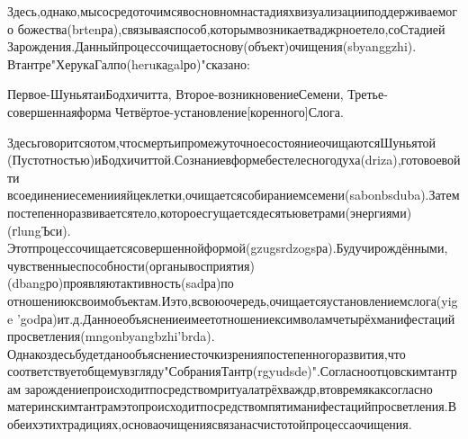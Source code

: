 Здесь,однако,мысосредоточимсявосновномнастадияхвизуализацииподдерживаемого
божества(brtenра),связываяспособ,которымвозникаетваджрноетело,соСтадией
Зарождения.Данныйпроцессочищаетоснову(объект)очищения(sbyanggzhi).
Втантре"ХерукаГалпо(heruкаgalро)"сказано:

Первое-ШуньятаиБодхичитта,
Второе-возникновениеСемени,
Третье-совершеннаяформа
Четвёртое-установление[коренного]Слога.

Здесьговоритсяотом,чтосмертьипромежуточноесостояниеочищаютсяШуньятой
(Пустотностью)иБодхичиттой.Сознаниевформебестелесногодуха(driza),готовоевойти
всоединениесемениияйцеклетки,очищаетсясобираниемсемени(sabonbsduba).Затем
постепенноразвиваетсятело,котороесгущаетсядесятьюветрами(энергиями)(гlungЪси).
Этотпроцессочищаетсясовершеннойформой(gzugsrdzogsра).Будучирождёнными,
чувственныеспособности(органывосприятия)(dbangро)проявляютактивность(sadра)по
отношениюксвоимобъектам.Иэто,всвоюочередь,очищаетсяустановлениемслога(yige
'godра)ит.д.Данноеобъяснениеимеетотношениексимволамчетырёхманифестаций
просветления(mngonbyangbzhi'brda).
Однакоздесьбудетданообъяснениесточкизренияпостепенногоразвития,что
соответствуетобщемувзгляду"СобранияТантр(rgyudsde)".Согласноотцовскимтантрам
зарождениепроисходитпосредствомритуалатрёхваждр,втовремякаксогласно
материнскимтантрамэтопроисходитпосредствомпятиманифестацийпросветления.В
обеихэтихтрадициях,основаочищениясвязанасчистотойпроцессаочищения.

